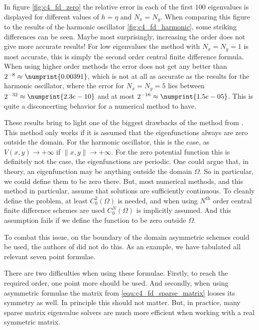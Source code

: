 In figure \ref{fig:c4_fd_zero} the relative error in each of the first $100$ eigenvalues is displayed for different values of $h = \eta$ and $N_x = N_y$. When comparing this figure to the results of the harmonic oscillator \ref{fig:c4_fd_harmonic}, some striking differences can be seen. Maybe most surprisingly, increasing the order does not give more accurate results! For low eigenvalues the method with $N_x=N_y=1$ is most accurate, this is simply the second order central finite difference formula. When using higher order methods the error does not get any better than $2^{-8}\approx \numprint{0.00391}$, which is not at all as accurate as the results for the harmonic oscillator, where the error for $N_x=N_y = 5$ lies between $2^{-32} \approx \numprint{2.3e-10}$ and at most $2^{-16} \approx \numprint{1.5e-05}$. This is quite a disconcerting behavior for a numerical method to have.

These results bring to light one of the biggest drawbacks of the method from \cite{wang_new_2009}. This method only works if it is assumed that the eigenfunctions always are zero outside the domain. For the harmonic oscillator, this is the case, as $V(x, y) \to +\infty$ if $\|x, y\| \to +\infty$. For the zero potential function this is definitely not the case, the eigenfunctions are periodic. One could argue that, in theory, an eigenfunction may be anything outside the domain $\Omega$. So in particular, we could define them to be zero there. But, most numerical methods, and this method in particular, assume that solutions are sufficiently continuous. To cleanly define the problem, at least $C_0^2(\Omega)$ is needed, and when using $N^\text{th}$ order central finite difference schemes are used $C_0^{N}(\Omega)$ is implicitly assumed. And this assumption fails if we define the function to be zero outside $\Omega$.

To combat this issue, on the boundary of the domain asymmetric schemes could be used, the authors of \cite{wang_new_2009} did not do this. As an example, we have tabulated all relevant seven point formulae.
\begin{center}
    
\end{center}
There are two difficulties when using these formulae. Firstly, to reach the required order, one point more should be used. And secondly, when using asymmetric formulae the matrix from \eqref{equ:c4_fd_sparse_matrix} looses its symmetry as well. In principle this should not matter. But, in practice, many sparse matrix eigenvalue solvers are much more efficient when working with a real symmetric matrix.

